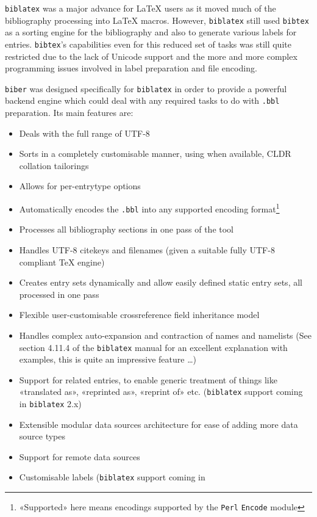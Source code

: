 \documentclass{ltxdockit}
\begin{document}
\verb+biblatex+ was a major advance for LaTeX users as it moved much
of the bibliography processing into LaTeX macros. However,
\verb+biblatex+ still used \verb+bibtex+ as a sorting engine for the
bibliography and also to generate various labels for
entries. \verb+bibtex+'s capabilities even for this reduced set of
tasks was still quite restricted due to the lack of Unicode support and
the more and more complex programming issues involved in label
preparation and file encoding.

\verb+biber+ was designed specifically for \verb+biblatex+ in order to
provide a powerful backend engine which could deal with any required
tasks to do with \verb+.bbl+ preparation. Its main features are:

\begin{itemize}
\item Deals with the full range of UTF-8
\item Sorts in a completely customisable manner, using when available,
  CLDR collation tailorings
\item Allows for per-entrytype options
\item Automatically encodes the \verb+.bbl+ into any supported encoding
  format\footnote{«Supported» here means encodings supported by the
    \texttt{Perl} \texttt{Encode} module}
\item Processes all bibliography sections in one pass of the tool
\item Handles UTF-8 citekeys and filenames (given a suitable fully
  UTF-8 compliant TeX engine)
\item Creates entry sets dynamically and allow easily defined static entry sets,
  all processed in one pass
\item Flexible user-customisable crossreference field inheritance
  model
\item Handles complex auto-expansion and contraction of names and
  namelists (See section 4.11.4 of the \verb+biblatex+ manual for an excellent
  explanation with examples, this is quite an impressive feature \ldots)
\item Support for related entries, to enable generic treatment of things
  like «translated as», «reprinted as», «reprint of»
  etc. (\verb+biblatex+ support coming in \verb+biblatex+ 2.x)
\item Extensible modular data sources architecture for ease of adding
  more data source types
\item Support for remote data sources
\item Customisable labels (\verb+biblatex+ support coming in

\end{itemize}
\end{document}
